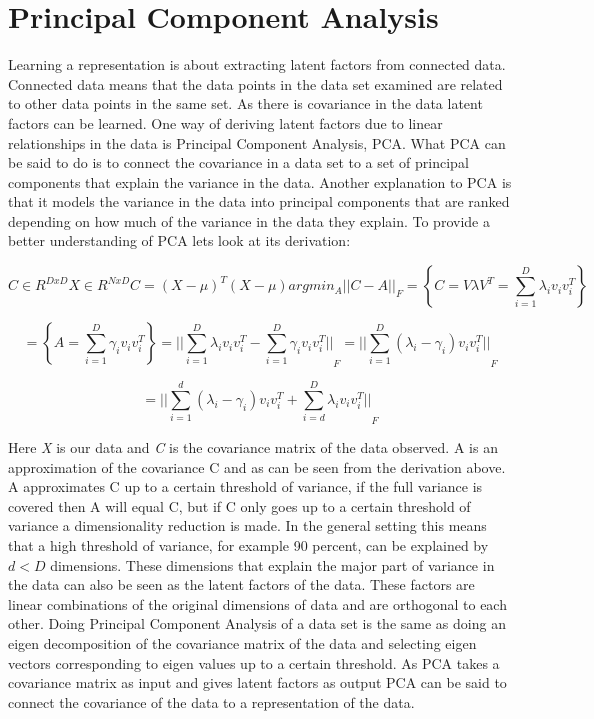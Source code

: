 \documentclass[a4paper,11pt]{kth-mag}
\begin{document}
\section{Principal Component Analysis} 
Learning a representation is about extracting latent factors from connected data. Connected data means that the data points in the data set examined are related to other data points in the same set. As there is covariance in the data latent factors can be learned. One way of deriving latent factors due to linear relationships in the data is Principal Component Analysis, PCA. What PCA can be said to do is to connect the covariance in a data set to a set of principal components that explain the variance in the data. Another explanation to PCA is that it models the variance in the data into principal components that are ranked depending on how much of the variance in the data they explain. To provide a better understanding of PCA  lets look at its derivation:

\begin{equation}
C \in R^{D x D}
X \in R^{N x D} 
C = (X - \mu)^T (X - \mu)
argmin_A {||C - A||}_F = \left\{C = V \lambda V^T = \sum_{i=1}^{D}\lambda_i v_i v_i^T \right\} 
\end{equation}

\begin{equation}
= \left\{ A = \sum_{i=1}^{D}\gamma_i v_i v_i^T \right\} = {|| \sum_{i=1}^{D}\lambda_i v_i v_i^T - \sum_{i=1}^{D}\gamma_i  v_i v_i^T ||}_F = {|| \sum_{i=1}^{D}(\lambda_i - \gamma_i) v_i v_i^T ||}_F 
\end{equation}

\begin{equation}
= {|| \sum_{i=1}^{d}(\lambda_i - \gamma_i) v_i v_i^T + \sum_{i = d}^{D}\lambda_i v_i v_i^T ||}_F
\end{equation}

Here \textit{X} is our data and \textit{C} is the covariance matrix of the data observed. A is an approximation of the covariance C and as can be seen from the derivation above. A approximates C up to a certain threshold of variance, if the full variance is covered then A will equal C, but if C only goes up to a certain threshold of variance a dimensionality reduction is made. In the general setting this means that a high threshold of variance, for example 90 percent, can be explained by $d < D$ dimensions. These dimensions that explain the major part of variance in the data can also be seen as the latent factors of the data. These factors are linear combinations of the original dimensions of data and are orthogonal to each other. Doing Principal Component Analysis of a data set is the same as doing an eigen decomposition of the covariance matrix of the data and selecting eigen vectors corresponding to eigen values up to a certain threshold. As PCA takes a covariance matrix as input and gives latent factors as output PCA can be said to connect the covariance of the data to a representation of the data.
\end{document}
